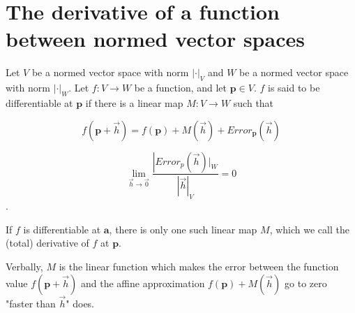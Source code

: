 
\section{The derivative of a function between normed vector spaces}

	\begin{definition}
		Let $V$ be a normed vector space with norm $|\cdot|_V$ and $W$ be a normed vector space with norm $|\cdot |_W$.
		Let $f :V \to W$ be a function, and let $\mathbf{p} \in V$.  
	 $f$ is said to be differentiable at $\mathbf{p}$ if there is a linear map $M:V \to W$ such that 
		
		\[ f(\mathbf{p}+\vec{h}) = f(\mathbf{p}) + M(\vec{h})+ Error_{\mathbf{p}}(\vec{h})\]
		
		\[ \lim_{\vec{h} \to \vec{0}} \frac{\left|Error_p(\vec{h})|_W}{\left|\vec{h}\right|_V} = 0 \].
		
		If $f$ is differentiable at $\mathbf{a}$, there is only one such linear map $M$, which we call the (total) derivative of $f$ at $\mathbf{p}$.  
		
		Verbally,  $M$ is the linear function which makes the error between the function value $f(\mathbf{p}+\vec{h})$ and the affine approximation 
		$f(\mathbf{p})+M(\vec{h})$ go to zero "faster than $\vec{h}$" does.
	\end{definition}
	
	

